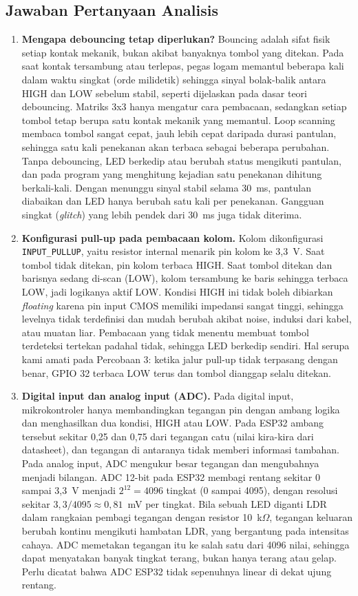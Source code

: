 \subsection{Jawaban Pertanyaan Analisis}
\begin{enumerate}
	\item \textbf{Mengapa debouncing tetap diperlukan?} Bouncing adalah sifat fisik setiap kontak mekanik, bukan akibat banyaknya tombol yang ditekan. Pada saat kontak tersambung atau terlepas, pegas logam memantul beberapa kali dalam waktu singkat (orde milidetik) sehingga sinyal bolak-balik antara HIGH dan LOW sebelum stabil, seperti dijelaskan pada dasar teori debouncing. Matriks 3x3 hanya mengatur cara pembacaan, sedangkan setiap tombol tetap berupa satu kontak mekanik yang memantul. Loop scanning membaca tombol sangat cepat, jauh lebih cepat daripada durasi pantulan, sehingga satu kali penekanan akan terbaca sebagai beberapa perubahan. Tanpa debouncing, LED berkedip atau berubah status mengikuti pantulan, dan pada program yang menghitung kejadian satu penekanan dihitung berkali-kali. Dengan menunggu sinyal stabil selama 30~ms, pantulan diabaikan dan LED hanya berubah satu kali per penekanan. Gangguan singkat (\emph{glitch}) yang lebih pendek dari 30~ms juga tidak diterima.

	\item \textbf{Konfigurasi pull-up pada pembacaan kolom.} Kolom dikonfigurasi \texttt{INPUT\_PULLUP}, yaitu resistor internal menarik pin kolom ke 3,3~V. Saat tombol tidak ditekan, pin kolom terbaca HIGH. Saat tombol ditekan dan barisnya sedang di-scan (LOW), kolom tersambung ke baris sehingga terbaca LOW, jadi logikanya aktif LOW. Kondisi HIGH ini tidak boleh dibiarkan \emph{floating} karena pin input CMOS memiliki impedansi sangat tinggi, sehingga levelnya tidak terdefinisi dan mudah berubah akibat noise, induksi dari kabel, atau muatan liar. Pembacaan yang tidak menentu membuat tombol terdeteksi tertekan padahal tidak, sehingga LED berkedip sendiri. Hal serupa kami amati pada Percobaan 3: ketika jalur pull-up tidak terpasang dengan benar, GPIO 32 terbaca LOW terus dan tombol dianggap selalu ditekan.

	\item \textbf{Digital input dan analog input (ADC).} Pada digital input, mikrokontroler hanya membandingkan tegangan pin dengan ambang logika dan menghasilkan dua kondisi, HIGH atau LOW. Pada ESP32 ambang tersebut sekitar 0,25 dan 0,75 dari tegangan catu (nilai kira-kira dari datasheet), dan tegangan di antaranya tidak memberi informasi tambahan. Pada analog input, ADC mengukur besar tegangan dan mengubahnya menjadi bilangan. ADC 12-bit pada ESP32 membagi rentang sekitar 0 sampai 3,3~V menjadi $2^{12} = 4096$ tingkat (0 sampai 4095), dengan resolusi sekitar $3{,}3/4095 \approx 0{,}81$~mV per tingkat. Bila sebuah LED diganti LDR dalam rangkaian pembagi tegangan dengan resistor 10~k$\Omega$, tegangan keluaran berubah kontinu mengikuti hambatan LDR, yang bergantung pada intensitas cahaya. ADC memetakan tegangan itu ke salah satu dari 4096 nilai, sehingga dapat menyatakan banyak tingkat terang, bukan hanya terang atau gelap. Perlu dicatat bahwa ADC ESP32 tidak sepenuhnya linear di dekat ujung rentang.
\end{enumerate}

